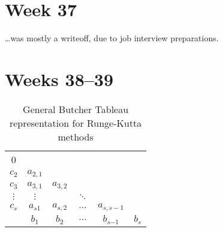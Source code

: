 \section{Week 37}
\label{sec:37}

\ldots was mostly a writeoff, due to job interview preparations.

\section{Weeks 38--39}

\begin{table}[h]
    \caption{General Butcher Tableau representation for Runge-Kutta methods}
    \label{tab:general_butcher_tableau}
    \centering
    \begin{tabular}{c|ccccc}
        0 \\
        $c_{\scriptscriptstyle 2}$ & $a_{\scriptscriptstyle 2,1}$ \\
        $c_{\scriptscriptstyle 3}$ & $a_{\scriptscriptstyle 3,1}$ & $a_{\scriptscriptstyle 3,2}$ \\
        $\vdots$ & $\vdots$ & & $\ddots$ \\
        $c_{s}$ & $a_{s1}$ & $a_{s, \scriptscriptstyle 2}$ & $\ldots$ & $a_{s,s \scriptscriptstyle -1}$ \\
        \hline
        & $b_{\scriptscriptstyle 1}$ & $b_{\scriptscriptstyle 2}$ & $\ldots$ & $b_{s \scriptscriptstyle{-1}}$ & $b_{s}$
    \end{tabular}
\end{table}

